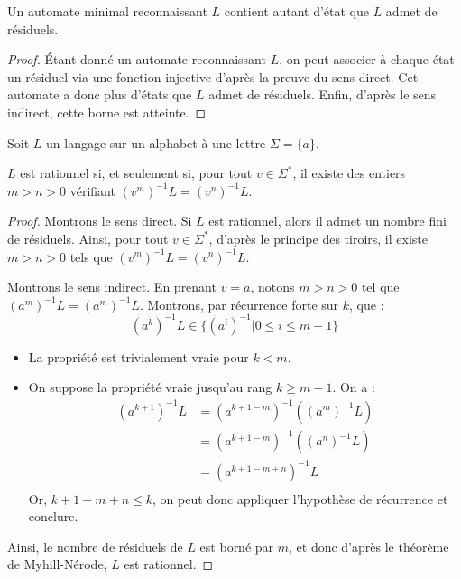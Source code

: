\begin{proposition}
Un automate minimal reconnaissant $L$ contient autant d'état que $L$ admet de résiduels.
\end{proposition}

\begin{proof}
Étant donné un automate reconnaissant $L$, on peut associer à chaque état un résiduel via une fonction injective d'après la preuve du sens direct. Cet automate a donc plus d'états que $L$ admet de résiduels. Enfin, d'après le sens indirect, cette borne est atteinte.
\end{proof}


\begin{lemma}
Soit $L$ un langage sur un alphabet à une lettre $\Sigma=\{a\}$.

$L$ est rationnel si, et seulement si, pour tout $v\in \Sigma^*$, il existe des entiers $m>n>0$ vérifiant $(v^m)^{-1}L=(v^n)^{-1}L$.
\end{lemma}

\begin{proof}
Montrons le sens direct. Si $L$ est rationnel, alors il admet un nombre fini de résiduels. Ainsi, pour tout $v\in \Sigma^*$, d'après le principe des tiroirs, il existe $m>n>0$ tels que $(v^m)^{-1}L=(v^n)^{-1}L$.


Montrons le sens indirect. En prenant $v=a$, notons $m>n>0$ tel que $(a^m)^{-1}L=(a^m)^{-1}L$. Montrons, par récurrence forte sur $k$, que :
$$
(a^k)^{-1}L\in \{(a^i)^{-1} | 0\leq i \leq m-1\}
$$
\begin{itemize}
\item La propriété est trivialement vraie pour $k<m$.
\item On suppose la propriété vraie jusqu'au rang $k\geq m-1$. On a :
\begin{align*}
(a^{k+1})^{-1}L &= (a^{k+1-m})^{-1}((a^m)^{-1}L) \\
&=(a^{k+1-m})^{-1}((a^n)^{-1}L) \\
&=(a^{k+1-m+n})^{-1}L \\
\end{align*}
Or, $k+1-m+n \leq k$, on peut donc appliquer l'hypothèse de récurrence et conclure.
\end{itemize}

Ainsi, le nombre de résiduels de $L$ est borné par $m$, et donc d'après le théorème de Myhill-Nérode, $L$ est rationnel. 
\end{proof}
